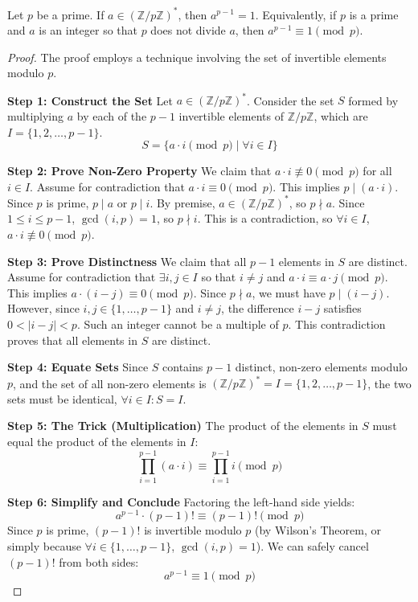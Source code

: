 \begin{theorem}
Let $p$ be a prime. If $a \in (\mathbb{Z}/p\mathbb{Z})^*$, then $a^{p-1} = 1$.
Equivalently, if $p$ is a prime and $a$ is an integer so that $p$ does not divide $a$, then $a^{p-1} \equiv 1 \pmod{p}$.
\end{theorem}
\begin{proof}
The proof employs a technique involving the set of invertible elements modulo $p$.

\textbf{Step 1: Construct the Set}
Let $a \in (\mathbb{Z}/p\mathbb{Z})^*$. Consider the set $S$ formed by multiplying $a$ by each of the $p-1$ invertible elements of $\mathbb{Z}/p\mathbb{Z}$, which are $I = \{1, 2, \ldots, p-1\}$.
$$
S = \{ a \cdot i \pmod{p} \mid \forall i \in I \}
$$

\textbf{Step 2: Prove Non-Zero Property}
We claim that $a \cdot i \not\equiv 0 \pmod{p}$ for all $i \in I$.
Assume for contradiction that $a \cdot i \equiv 0 \pmod{p}$. This implies $p \mid (a \cdot i)$. Since $p$ is prime, $p \mid a$ or $p \mid i$.
By premise, $a \in (\mathbb{Z}/p\mathbb{Z})^*$, so $p \nmid a$.
Since $1 \le i \le p-1$, $\gcd(i, p) = 1$, so $p \nmid i$.
This is a contradiction, so $\forall i \in I$, $a \cdot i \not\equiv 0 \pmod{p}$.

\textbf{Step 3: Prove Distinctness}
We claim that all $p-1$ elements in $S$ are distinct.
Assume for contradiction that $\exists i, j \in I$ so that $i \ne j$ and $a \cdot i \equiv a \cdot j \pmod{p}$.
This implies $a \cdot (i-j) \equiv 0 \pmod{p}$. Since $p \nmid a$, we must have $p \mid (i-j)$.
However, since $i, j \in \{1, \ldots, p-1\}$ and $i \ne j$, the difference $i-j$ satisfies $0 < |i-j| < p$. Such an integer cannot be a multiple of $p$.
This contradiction proves that all elements in $S$ are distinct.

\textbf{Step 4: Equate Sets}
Since $S$ contains $p-1$ distinct, non-zero elements modulo $p$, and the set of all non-zero elements is $(\mathbb{Z}/p\mathbb{Z})^* = I = \{1, 2, \ldots, p-1\}$, the two sets must be identical, $\forall i \in I : S = I$.

\textbf{Step 5: The Trick (Multiplication)}
The product of the elements in $S$ must equal the product of the elements in $I$:
$$
\prod_{i=1}^{p-1} (a \cdot i) \equiv \prod_{i=1}^{p-1} i \pmod{p}
$$

\textbf{Step 6: Simplify and Conclude}
Factoring the left-hand side yields:
$$
a^{p-1} \cdot (p-1)! \equiv (p-1)! \pmod{p}
$$
Since $p$ is prime, $(p-1)!$ is invertible modulo $p$ (by Wilson's Theorem, or simply because $\forall i \in \{1, \ldots, p-1\}$, $\gcd(i, p)=1$). We can safely cancel $(p-1)!$ from both sides:
$$
a^{p-1} \equiv 1 \pmod{p}
$$
\end{proof}

